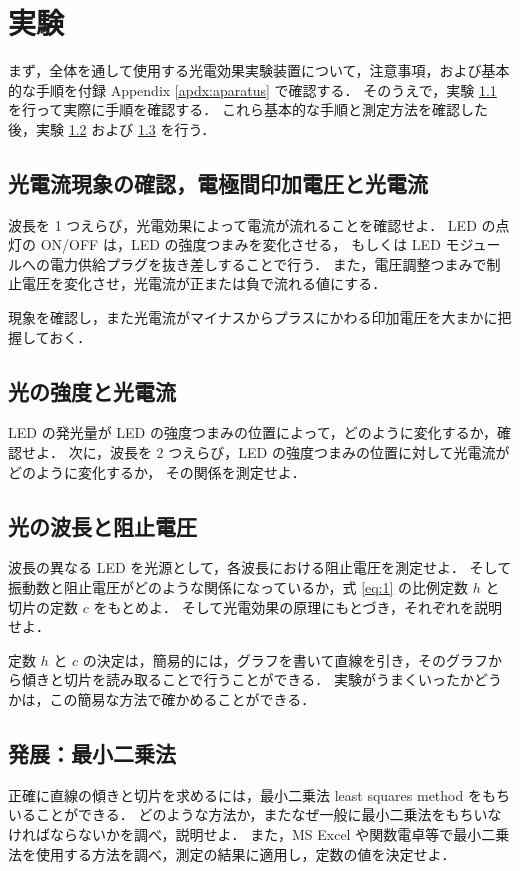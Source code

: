\documentclass[11pt,sort]{jarticle}
\begin{document}
\section{実験}

まず，全体を通して使用する光電効果実験装置について，注意事項，および基本的な手順を付録 Appendix \ref{apdx:aparatus} で確認する．
そのうえで，実験 \ref{a} を行って実際に手順を確認する．
これら基本的な手順と測定方法を確認した後，実験 \ref{b} および \ref{c} を行う．


\subsection{光電流現象の確認，電極間印加電圧と光電流}\label{a}

波長を 1 つえらび，光電効果によって電流が流れることを確認せよ．
LED の点灯の ON/OFF は，LED の強度つまみを変化させる，
もしくは LED モジュールへの電力供給プラグを抜き差しすることで行う．
また，電圧調整つまみで制止電圧を変化させ，光電流が正または負で流れる値にする．

現象を確認し，また光電流がマイナスからプラスにかわる印加電圧を大まかに把握しておく．

\subsection{光の強度と光電流}\label{b}

LED の発光量が LED の強度つまみの位置によって，どのように変化するか，確認せよ．
次に，波長を 2 つえらび，LED の強度つまみの位置に対して光電流がどのように変化するか，
その関係を測定せよ．

\subsection{光の波長と阻止電圧}\label{c}

波長の異なる LED を光源として，各波長における阻止電圧を測定せよ．
そして振動数と阻止電圧がどのような関係になっているか，式 \ref{eq:1} の比例定数 $h$ と切片の定数 $c$ をもとめよ．
そして光電効果の原理にもとづき，それぞれを説明せよ．

定数 $h$ と $c$ の決定は，簡易的には，グラフを書いて直線を引き，そのグラフから傾きと切片を読み取ることで行うことができる．
実験がうまくいったかどうかは，この簡易な方法で確かめることができる．

\subsection{発展：最小二乗法}
正確に直線の傾きと切片を求めるには，最小二乗法 least squares method をもちいることができる．
どのような方法か，またなぜ一般に最小二乗法をもちいなければならないかを調べ，説明せよ．
また，MS Excel や関数電卓等で最小二乗法を使用する方法を調べ，測定の結果に適用し，定数の値を決定せよ．
\end{document}
